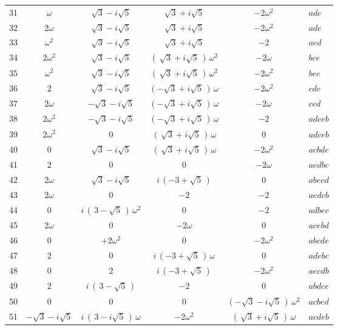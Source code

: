 \documentclass[11pt]{article}
\begin{document}
\begin{center}
\begin{longtable}{r|cccc|l}
31 & $\omega$ & $\sqrt{3} - i\sqrt{5}$ & $\sqrt{3} + i\sqrt{5}$ & $-2\omega^{2}$ & $adc$\\
32 & $2\omega$ & $\sqrt{3} - i\sqrt{5}$ & $\sqrt{3} + i\sqrt{5}$ & $-2\omega^{2}$ & $ade$\\
33 & $\omega^{2}$ & $\sqrt{3} - i\sqrt{5}$ & $\sqrt{3} + i\sqrt{5}$ & $-2$ & $aed$\\
34 & $2\omega^{2}$ & $\sqrt{3} - i\sqrt{5}$ & $(\,\sqrt{3} + i\sqrt{5}\,)\,\omega^{2}$ & $-2\omega$ & $bce$\\
35 & $\omega^{2}$ & $\sqrt{3} - i\sqrt{5}$ & $(\,\sqrt{3} + i\sqrt{5}\,)\,\omega^{2}$ & $-2\omega^{2}$ & $bec$\\
36 & $2$ & $\sqrt{3} - i\sqrt{5}$ & $(-\sqrt{3} + i\sqrt{5}\,)\,\omega$ & $-2\omega^{2}$ & $cde$\\
37 & $2\omega$ & $-\sqrt{3} - i\sqrt{5}$ & $(-\sqrt{3} + i\sqrt{5}\,)\,\omega$ & $-2\omega$ & $ced$\\
38 & $2\omega^{2}$ & $-\sqrt{3} - i\sqrt{5}$ & $(-\sqrt{3} + i\sqrt{5}\,)\,\omega$ & $-2$ & $adceb$\\
39 & $2\omega^{2}$ & $0$ & $(\,\sqrt{3} + i\sqrt{5}\,)\,\omega$ & $0$ & $adceb$\\
40 & $0$ & $\sqrt{3} - i\sqrt{5}$ & $(\,\sqrt{3} + i\sqrt{5}\,)\,\omega$ & $-2\omega^{2}$ & $acbde$\\
41 & $2$ & $0$ & $0$ & $-2\omega$ & $aedbc$\\
42 & $2\omega$ & $\sqrt{3} - i\sqrt{5}$ & $i\,(-3 + \sqrt{5}\,)$ & $0$ & $abecd$\\
43 & $2\omega$ & $0$ & $-2$ & $-2$ & $aedcb$\\
44 & $0$ & $i\,(\,3 - \sqrt{5}\,)\,\omega^{2}$ & $0$ & $-2$ & $adbec$\\
45 & $2\omega$ & $0$ & $-2\omega$ & $0$ & $acebd$\\
46 & $0$ & $+ 2\omega^{2}$ & $0$ & $-2\omega^{2}$ & $abcde$\\
47 & $2$ & $0$ & $i\,(-3 + \sqrt{5}\,)\,\omega$ & $0$ & $adebc$\\
48 & $0$ & $2$ & $i\,(-3 + \sqrt{5}\,)$ & $-2\omega^{2}$ & $aecdb$\\
49 & $2$ & $i\,(\,3 - \sqrt{5}\,)$ & $-2$ & $0$ & $abdce$\\
50 & $0$ & $0$ & $0$ & $(-\sqrt{3} - i\sqrt{5}\,)\,\omega^{2}$ & $acbed$\\
51 & $-\sqrt{3} - i\sqrt{5}$ & $i\,(\,3 - i\sqrt{5}\,)\,\omega$ & $-2\omega^{2}$ & $(\,\sqrt{3} + i\sqrt{5}\,)\,\omega$ & $acdeb$\\

\end{longtable}
\end{center}
\end{document}
